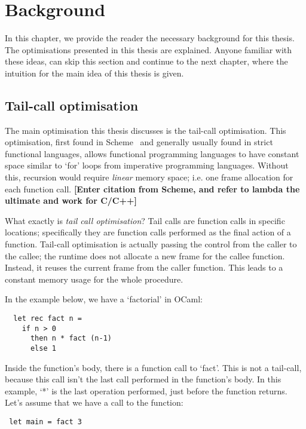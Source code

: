 \documentclass[diploma]{softlab-thesis}
\begin{document}
\chapter{Background}

In this chapter, we provide the reader the necessary background for this thesis. The optimisations presented in this thesis 
are explained. Anyone familiar with these ideas, can skip this section and continue to the next chapter, where the intuition for the 
main idea of this thesis is given.

\section{Tail-call optimisation}


The main optimisation this thesis discusses is the tail-call optimisation. This optimisation, first found in Scheme~\cite{Sussman:1975:IEL:889230,Steele:1976:LUI:889232} and
generally usually found in strict functional languages, 
allows functional programming languages to have constant space similar to `for' loops from imperative programming languages. 
Without this, recursion would require \textit{linear} memory space; i.e. one frame allocation for each function call. 
\textbf{[Enter citation from Scheme, and refer to lambda the ultimate and work for C/C++]}

What exactly is \textit{tail call optimisation}? Tail calls are function calls in specific locations;
specifically they are function calls performed as the final action of a function. Tail-call optimisation is actually passing 
the control from the caller to the callee; the runtime does not allocate a new frame for the 
callee function. Instead, it reuses the current frame from the caller function. This leads to 
a constant memory usage for the whole procedure. 

In the example below, we have a `factorial' in OCaml:
\begin{verbatim}
  let rec fact n = 
    if n > 0 
      then n * fact (n-1)
      else 1
\end{verbatim}

Inside the function's body, there is a function call to `fact'. This is not a tail-call, because this call isn't 
the last call performed in the function's body. In this example, `*' is the last operation performed, just before the function returns.
Let's assume that we have a call to the function:
\begin{verbatim}
 let main = fact 3
\end{verbatim}
\end{document}
